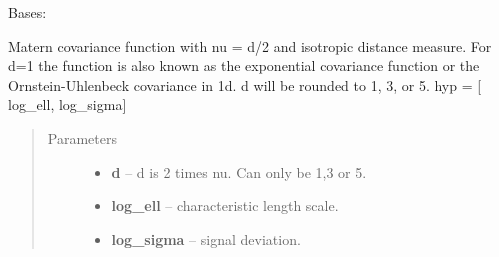 \documentclass[letterpaper,10pt,english]{sphinxmanual}
\begin{document}
\begin{fulllineitems}
\label{pyGPs.Core:pyGPs.Core.cov.Matern}
Bases: {\hyperref[pyGPs.Core:pyGPs.Core.cov.Kernel]{}}

Matern covariance function with nu = d/2 and isotropic distance measure. 
For d=1 the function is also known as the exponential covariance function 
or the Ornstein-Uhlenbeck covariance in 1d.
d will be rounded to 1, 3, or 5.
hyp = {[} log\_ell, log\_sigma{]}
\begin{quote}\begin{description}
\item[{Parameters}] \leavevmode\begin{itemize}
\item {} 
\textbf{d} -- d is 2 times nu. Can only be 1,3 or 5.

\item {} 
\textbf{log\_ell} -- characteristic length scale.

\item {} 
\textbf{log\_sigma} -- signal deviation.

\end{itemize}

\end{description}\end{quote}

\begin{fulllineitems}
\label{pyGPs.Core:pyGPs.Core.cov.Matern.dfunc}
\end{fulllineitems}


\begin{fulllineitems}
\label{pyGPs.Core:pyGPs.Core.cov.Matern.dmfunc}
\end{fulllineitems}


\begin{fulllineitems}
\label{pyGPs.Core:pyGPs.Core.cov.Matern.func}
\end{fulllineitems}


\end{fulllineitems}
\end{document}
